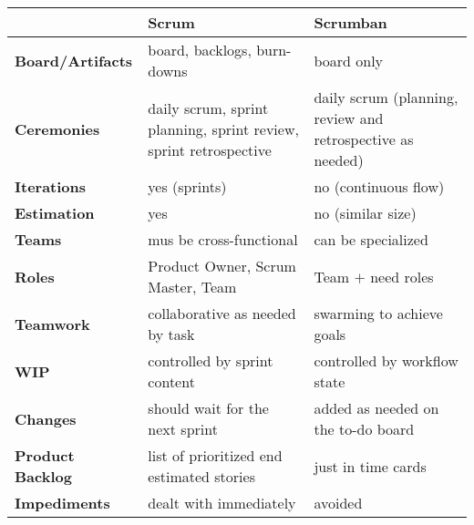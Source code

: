 \documentclass[../main.tex]{subfiles}
\begin{document}
    \begin{table}[H]
        \begin{center}
            \begin{tabular}{| p{3cm} | p{6cm} p{6cm} |}
                \toprule
                & \textbf{Scrum} & \textbf{Scrumban}\\
                \toprule

                \cmidrule(r){1-1}\cmidrule(rl){2-2}\cmidrule(l){3-3}
                \textbf{Board/Artifacts} & board, backlogs, burn-downs & board only\\

                \cmidrule(r){1-1}\cmidrule(rl){2-2}\cmidrule(l){3-3}
                \textbf{Ceremonies} & daily scrum, sprint planning, sprint review, sprint retrospective
                & daily scrum (planning, review and retrospective as needed)\\

                \cmidrule(r){1-1}\cmidrule(rl){2-2}\cmidrule(l){3-3}
                \textbf{Iterations} & yes (sprints) & no (continuous flow)\\

                \cmidrule(r){1-1}\cmidrule(rl){2-2}\cmidrule(l){3-3}
                \textbf{Estimation} & yes & no (similar size)\\

                \cmidrule(r){1-1}\cmidrule(rl){2-2}\cmidrule(l){3-3}
                \textbf{Teams} & mus be cross-functional & can be specialized\\

                \cmidrule(r){1-1}\cmidrule(rl){2-2}\cmidrule(l){3-3}
                \textbf{Roles} & Product Owner, Scrum Master, Team & Team $+$ need roles\\

                \cmidrule(r){1-1}\cmidrule(rl){2-2}\cmidrule(l){3-3}
                \textbf{Teamwork} & collaborative as needed by task & swarming to achieve goals\\

                \cmidrule(r){1-1}\cmidrule(rl){2-2}\cmidrule(l){3-3}
                \textbf{WIP} & controlled by sprint content & controlled by workflow state\\

                \cmidrule(r){1-1}\cmidrule(rl){2-2}\cmidrule(l){3-3}
                \textbf{Changes} & should wait for the next sprint & added as needed on the to-do board\\

                \cmidrule(r){1-1}\cmidrule(rl){2-2}\cmidrule(l){3-3}
                \textbf{Product Backlog} & list of prioritized end estimated stories & just in time cards\\

                \cmidrule(r){1-1}\cmidrule(rl){2-2}\cmidrule(l){3-3}
                \textbf{Impediments} & dealt with immediately & avoided\\

                \bottomrule
            \end{tabular}
        \end{center}
    \end{table}
\end{document}
